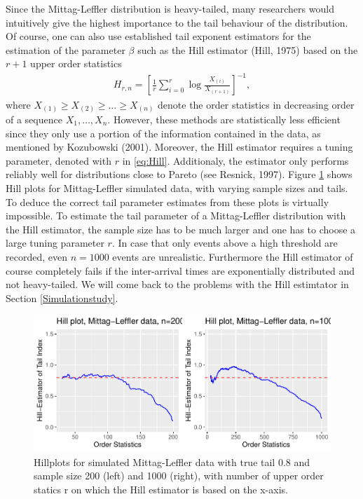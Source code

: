 \documentclass[]{elsarticle} %
\begin{document}
Since the Mittag-Leffler distribution is heavy-tailed, many researchers
would intuitively give the highest importance to the tail behaviour of
the distribution. Of course, one can also use established tail exponent
estimators for the estimation of the parameter \(\beta\) such as the
Hill estimator (Hill, 1975) based on the \(r+1\) upper order statistics
\begin{align}\label{eq:Hill}
H_{r,n}=\left[ \frac{1}{r} \sum_{i=0}^{r} \log \frac{X_{(i)}}{X_{(r+1)}}\right]^{-1}, 
\end{align} where \(X_{(1)} \geq X_{(2)} \geq \ldots \geq X_{(n)}\)
denote the order statistics in decreasing order of a sequence
\(X_1,\ldots,X_n\). However, these methods are statistically less
efficient since they only use a portion of the information contained in
the data, as mentioned by Kozubowski (2001). Moreover, the Hill
estimator requires a tuning parameter, denoted with \(r\) in
\eqref{eq:Hill}. Additionaly, the estimator only performs reliably well
for distributions close to Pareto (see Resnick, 1997). Figure
\ref{fig:Hillplots} shows Hill plots for Mittag-Leffler simulated data,
with varying sample sizes and tails. To deduce the correct tail
parameter estimates from these plots is virtually impossible. To
estimate the tail parameter of a Mittag-Leffler distribution with the
Hill estimator, the sample size has to be much larger and one has to
choose a large tuning parameter \(r\). In case that only events above a
high threshold are recorded, even \(n=1000\) events are unrealistic.
Furthermore the Hill estimator of course completely fails if the
inter-arrival times are exponentially distributed and not heavy-tailed.
We will come back to the problems with the Hill estimtator in Section
\ref{Simulationstudy}.

\begin{figure}

{\centering \includegraphics[width=0.9\linewidth]{article_springer_files/figure-latex/Hillplots-1} 

}

\caption{\label{fig:Hillplots} Hillplots for simulated Mittag-Leffler data with true tail 0.8 and sample size 200 (left) and 1000 (right), with number of upper order statics r on which the Hill estimator is based on the x-axis. }\label{fig:Hillplots}
\end{figure}
\end{document}
